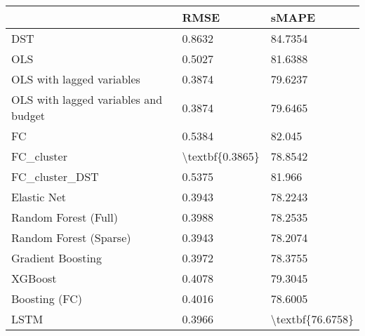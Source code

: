 \begin{tabular}{lll}
\toprule
{} &             RMSE &             sMAPE \\
\midrule
DST                                  &           0.8632 &           84.7354 \\
OLS                                  &           0.5027 &           81.6388 \\
OLS with lagged variables            &           0.3874 &           79.6237 \\
OLS with lagged variables and budget &           0.3874 &           79.6465 \\
FC                                   &           0.5384 &            82.045 \\
FC\_cluster                           &  \textbackslash textbf\{0.3865\} &           78.8542 \\
FC\_cluster\_DST                       &           0.5375 &            81.966 \\
Elastic Net                          &           0.3943 &           78.2243 \\
Random Forest (Full)                 &           0.3988 &           78.2535 \\
Random Forest (Sparse)               &           0.3943 &           78.2074 \\
Gradient Boosting                    &           0.3972 &           78.3755 \\
XGBoost                              &           0.4078 &           79.3045 \\
Boosting (FC)                        &           0.4016 &           78.6005 \\
LSTM                                 &           0.3966 &  \textbackslash textbf\{76.6758\} \\
\bottomrule
\end{tabular}
